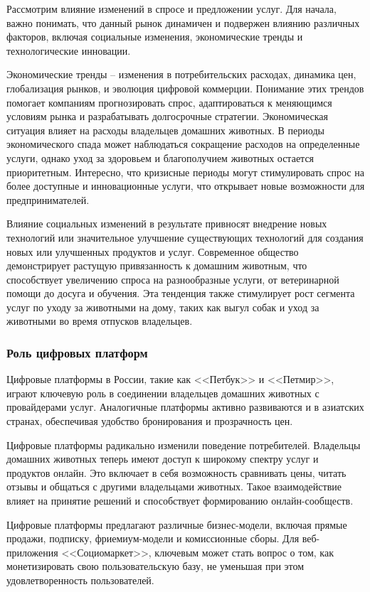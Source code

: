 Рассмотрим влияние изменений в спросе и предложении услуг. Для начала, важно понимать, что данный рынок динамичен и подвержен влиянию различных факторов, включая социальные изменения, экономические тренды и технологические инновации.

Экономические тренды – изменения в потребительских расходах, динамика цен, глобализация рынков, и эволюция цифровой коммерции. Понимание этих трендов помогает компаниям прогнозировать спрос, адаптироваться к меняющимся условиям рынка и разрабатывать долгосрочные стратегии. Экономическая ситуация влияет на расходы владельцев домашних животных. В периоды экономического спада может наблюдаться сокращение расходов на определенные услуги, однако уход за здоровьем и благополучием животных остается приоритетным. Интересно, что кризисные периоды могут стимулировать спрос на более доступные и инновационные услуги, что открывает новые возможности для предпринимателей.

Влияние социальных изменений в результате привносят внедрение новых технологий или значительное улучшение существующих технологий для создания новых или улучшенных продуктов и услуг. Современное общество демонстрирует растущую привязанность к домашним животным, что способствует увеличению спроса на разнообразные услуги, от ветеринарной помощи до досуга и обучения. Эта тенденция также стимулирует рост сегмента услуг по уходу за животными на дому, таких как выгул собак и уход за животными во время отпусков владельцев.
\subsubsection{Роль цифровых платформ}

Цифровые платформы в России, такие как <<Петбук>> и <<Петмир>>, играют ключевую роль в соединении владельцев домашних животных с провайдерами услуг. Аналогичные платформы активно развиваются и в азиатских странах, обеспечивая удобство бронирования и прозрачность цен.

Цифровые платформы радикально изменили поведение потребителей. Владельцы домашних животных теперь имеют доступ к широкому спектру услуг и продуктов онлайн. Это включает в себя возможность сравнивать цены, читать отзывы и общаться с другими владельцами животных. Такое взаимодействие влияет на принятие решений и способствует формированию онлайн-сообществ.

Цифровые платформы предлагают различные бизнес-модели, включая прямые продажи, подписку, фриемиум-модели и комиссионные сборы. Для веб-приложения <<Социомаркет>>, ключевым может стать вопрос о том, как монетизировать свою пользовательскую базу, не уменьшая при этом удовлетворенность пользователей.

